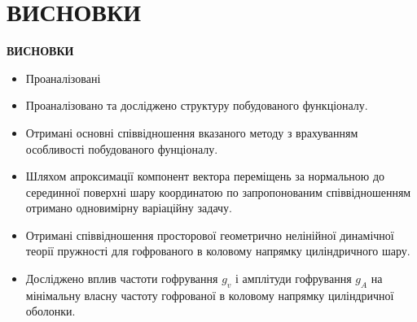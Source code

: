 \documentclass[8pt]{beamer}
\numberwithin{figure}{section}
\numberwithin{equation}{section}
\numberwithin{table}{section}
\begin{document}
\section{ВИСНОВКИ}
\begin{frame}
\textbf{\large ВИСНОВКИ}
\\
\vspace{1em}
\begin{itemize}
\item Проаналізовані
\item Проаналізовано та досліджено структуру побудованого функціоналу.
\item Отримані основні співвідношення вказаного методу з врахуванням особливості побудованого фунціоналу.
\item Шляхом апроксимації компонент вектора переміщень за нормальною до серединної поверхні шару координатою по запропонованим співвідношенням отримано одновимірну варіаційну задачу.
\item Отримані співвідношення просторової геометрично нелінійної динамічної теорії пружності для гофрованого в коловому напрямку циліндричного шару.
\item Досліджено вплив частоти гофрування $g_v$ і амплітуди гофрування $g_A$ на мінімальну власну частоту гофрованої в коловому напрямку циліндричної оболонки.
\end{itemize}



\end{frame}
\end{document}
